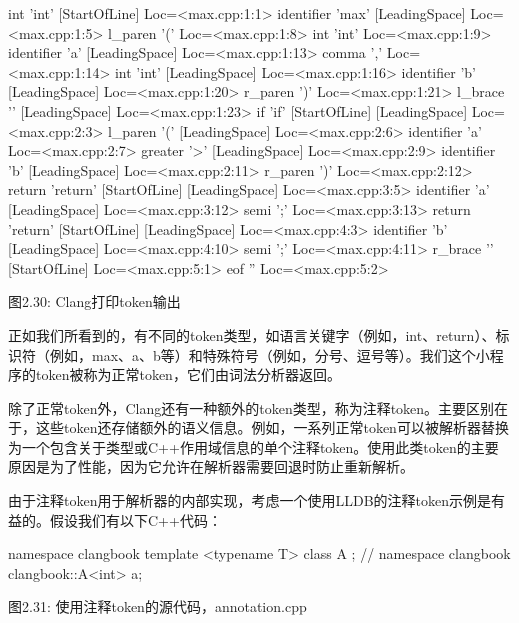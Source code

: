 \begin{shell}
int 'int'        [StartOfLine]  Loc=<max.cpp:1:1>
identifier 'max'         [LeadingSpace] Loc=<max.cpp:1:5>
l_paren '('             Loc=<max.cpp:1:8>
int 'int'               Loc=<max.cpp:1:9>
identifier 'a'   [LeadingSpace] Loc=<max.cpp:1:13>
comma ','               Loc=<max.cpp:1:14>
int 'int'        [LeadingSpace] Loc=<max.cpp:1:16>
identifier 'b'   [LeadingSpace] Loc=<max.cpp:1:20>
r_paren ')'             Loc=<max.cpp:1:21>
l_brace '{'      [LeadingSpace] Loc=<max.cpp:1:23>
if 'if'  [StartOfLine] [LeadingSpace]   Loc=<max.cpp:2:3>
l_paren '('      [LeadingSpace] Loc=<max.cpp:2:6>
identifier 'a'          Loc=<max.cpp:2:7>
greater '>'      [LeadingSpace] Loc=<max.cpp:2:9>
identifier 'b'   [LeadingSpace] Loc=<max.cpp:2:11>
r_paren ')'             Loc=<max.cpp:2:12>
return 'return'  [StartOfLine] [LeadingSpace]   Loc=<max.cpp:3:5>
identifier 'a'   [LeadingSpace] Loc=<max.cpp:3:12>
semi ';'                Loc=<max.cpp:3:13>
return 'return'  [StartOfLine] [LeadingSpace]   Loc=<max.cpp:4:3>
identifier 'b'   [LeadingSpace] Loc=<max.cpp:4:10>
semi ';'                Loc=<max.cpp:4:11>
r_brace '}'      [StartOfLine]  Loc=<max.cpp:5:1>
eof ''          Loc=<max.cpp:5:2>
\end{shell}

\begin{center}
图2.30: Clang打印token输出
\end{center}

正如我们所看到的，有不同的token类型，如语言关键字（例如，int、return）、标识符（例如，max、a、b等）和特殊符号（例如，分号、逗号等）。我们这个小程序的token被称为正常token，它们由词法分析器返回。

除了正常token外，Clang还有一种额外的token类型，称为注释token。主要区别在于，这些token还存储额外的语义信息。例如，一系列正常token可以被解析器替换为一个包含关于类型或C++作用域信息的单个注释token。使用此类token的主要原因是为了性能，因为它允许在解析器需要回退时防止重新解析。

由于注释token用于解析器的内部实现，考虑一个使用LLDB的注释token示例是有益的。假设我们有以下C++代码：

\begin{cpp}
namespace clangbook {
template <typename T> class A {};
} // namespace clangbook
clangbook::A<int> a;
\end{cpp}

\begin{center}
图2.31: 使用注释token的源代码，annotation.cpp
\end{center}

